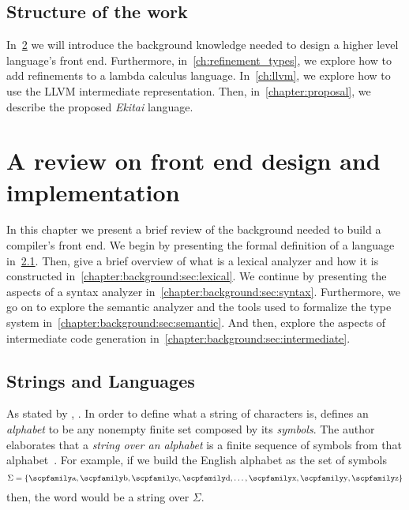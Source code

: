 \documentclass[
  oneside,
  english,
  coorientadorbanca,
  noabntexcite
]{ufsc-thesis-rn46-2019}
\newcommand{\code}[1]{\text{\scpfamily\setlength\spaceskip{0.35em}#1}}
\begin{document}
\section{Structure of the work}

In~\cref{chapter:background} we will introduce the background knowledge needed to design a higher level language's front end.
Furthermore, in~\cref{ch:refinement_types}, we explore how to add refinements to a lambda calculus language.
In~\cref{ch:llvm}, we explore how to use the LLVM intermediate representation.
Then, in~\cref{chapter:proposal}, we describe the proposed \textit{Ekitai} language.

\chapter{A review on front end design and implementation}\label{chapter:background}

In this chapter we present a brief review of the background needed to build a compiler's front end.
We begin by presenting the formal definition of a language in~\cref{ch:background:sec:strings_and_languages}.
Then, give a brief overview of what is a lexical analyzer and how it is constructed in~\cref{chapter:background:sec:lexical}.
We continue by presenting the aspects of a syntax analyzer in~\cref{chapter:background:sec:syntax}.
Furthermore, we go on to explore the semantic analyzer and the tools used to formalize the type system in~\cref{chapter:background:sec:semantic}.
And then, explore the aspects of intermediate code generation in~\cref{chapter:background:sec:intermediate}.

\section{Strings and Languages}\label{ch:background:sec:strings_and_languages}

As stated by \textcite{sipser2012introduction}, .
In order to define what a string of characters is, \textcite{sipser2012introduction} defines an \textit{alphabet} to be any nonempty finite set composed by its \textit{symbols}.
The author elaborates that a \textit{string over an alphabet} is a finite sequence of symbols from that alphabet~\cite{sipser2012introduction}.
For example, if we build the English alphabet as the set of symbols
\begin{equation*}
  \Sigma = \{\code{a}, \code{b}, \code{c}, \code{d}, \dots, \code{x}, \code{y}, \code{z}\}
\end{equation*}
then, the word \code{compiler} would be a string over $\Sigma$.
\end{document}
